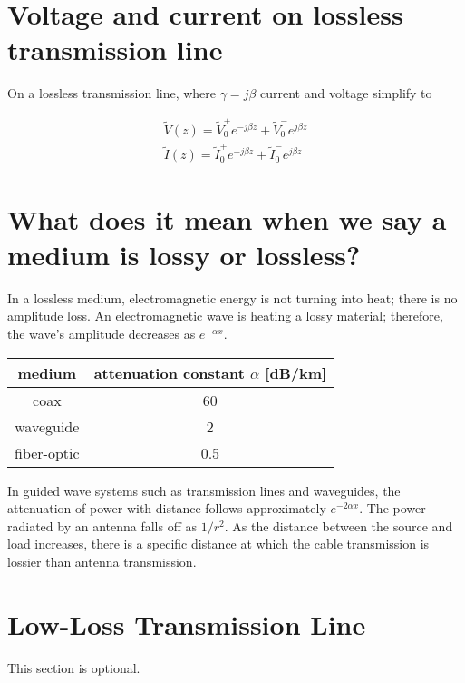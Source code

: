 \documentclass{ximera}
\begin{document}
\section{Voltage and current on lossless transmission line}

On a lossless transmission line, where $\gamma= j\beta$ current and voltage simplify to 

\begin{eqnarray}
\tilde{V}(z)=\tilde{V}_0^+ e^{-j \beta z} + \tilde{V}_0^- e^{j \beta z} \nonumber \\ \nonumber
\tilde{I}(z)=\tilde{I}_0^+ e^{- j \beta z} + \tilde{I}_0^- e^{j \beta z}
\end{eqnarray}


\section{What does it mean when we say a medium is lossy or lossless?}
In a lossless medium, electromagnetic energy is not turning into heat; there is no amplitude loss. An electromagnetic wave is heating a lossy material; therefore, the wave's amplitude decreases as $e^{-\alpha x}$.




\begin{center}
\begin{tabular}{|c|c|} \hline
medium     & attenuation constant $\alpha$ [dB/km]     \\  \hline       
coax        & 60                                 \\ \hline
 waveguide  & 2  \\ \hline          
fiber-optic &  0.5  \\ \hline
\end{tabular}
\end{center}


In guided wave systems such as transmission lines and waveguides, the attenuation of power with distance follows approximately $e^{-2\alpha x}$. The power radiated by an antenna falls off as $1/r^{2}$. As the distance between the source and load increases, there is a specific distance at which the cable transmission is lossier than antenna transmission.

\section{Low-Loss Transmission Line}

This section is optional.
\end{document}
